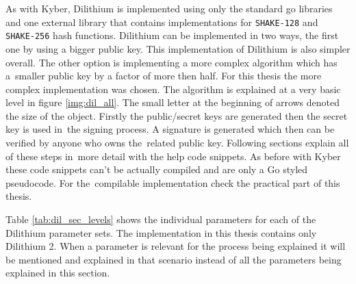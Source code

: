 As with Kyber, Dilithium is implemented using only the standard go libraries and one external library \cite{00fV2cvg7Z6H2tS3} that contains implementations for \texttt{SHAKE-128} and \texttt{SHAKE-256} hash functions. Dilithium can be implemented in two ways, the first one by using a bigger public key. This implementation of Dilithium is also simpler overall. The other option is implementing a more complex algorithm which has a~smaller public key by a factor of more then half. For this thesis the more complex implementation was chosen. The algorithm is explained at a very basic level in figure \ref{img:dil_all}. The small letter at the beginning of arrows denoted the size of the object. Firstly the public/secret keys are generated then the secret key is used in~the signing process. A signature is generated which then can be verified by anyone who owns the~related public key. Following sections explain all of these steps in~more detail with the help code snippets. As before with Kyber these code snippets can't be actually compiled and are only a Go styled pseudocode. For the~compilable implementation check the practical part of this thesis.

Table \ref{tab:dil_sec_levels} shows the individual parameters for each of the Dilithium parameter sets. The implementation in this thesis contains only Dilithium 2. When a parameter is relevant for the process being explained it will be mentioned and explained in that scenario instead of all the parameters being explained in this section.

